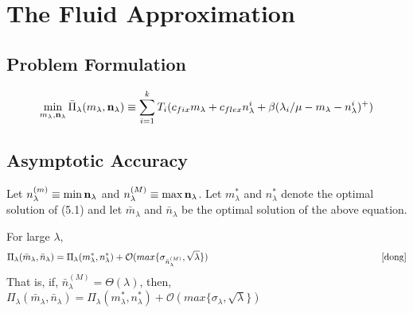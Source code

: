 \section{The Fluid Approximation} 
\subsection{Problem Formulation} 
\[\min_{m_{\lambda},\bold{n}_{\lambda}} \bar{\Pi}_{\lambda}(m_{\lambda},\bold{n}_{\lambda}) \equiv \sum_{i=1}^{k} T_i(c_{fix}m_{\lambda} + c_{flex}n_{\lambda}^i + \beta(\lambda_i/\mu - m_{\lambda} - n_{\lambda}^i)^+)\]
\subsection{Asymptotic Accuracy} 
Let $n_{\lambda}^{(m)} \equiv \min \bold{n}_{\lambda}$ and $n_{\lambda}^{(M)} \equiv \max \bold{n}_{\lambda}$. Let $m_{\lambda}^*$ and $n_{\lambda}^*$ denote the optimal solution of (5.1) and let $\bar{m}_{\lambda}$ and $\bar{n}_{\lambda}$ be the optimal solution of the above equation. 

\begin{theorem}
For large $\lambda$, 
\[ \Pi_{\lambda}(\bar{m}_{\lambda},\bar{n}_{\lambda}) = \Pi_{\lambda}(m_{\lambda}^*,n_{\lambda}^*) + \mathcal{O}(max\{\sigma_{\bar{n}_{\lambda}^{(M)}}, \sqrt{\lambda}\}) \hspace{6.5cm}  \cite{dong}\]
That is, if,  $\bar{n}_{\lambda}^{(M)}=\Theta(\lambda)$, then, $\Pi_{\lambda}(\bar{m}_{\lambda},\bar{n}_{\lambda}) = \Pi_{\lambda}(m_{\lambda}^*,n_{\lambda}^*) + \mathcal{O}(max\{\sigma_{\lambda}, \sqrt{\lambda}\})$ 
\end{theorem}
